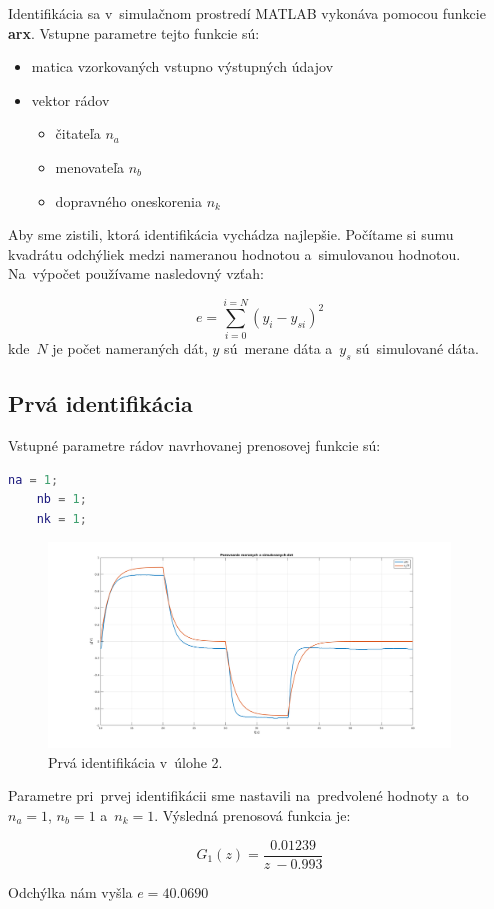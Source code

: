 \documentclass{article}
\begin{document}
Identifikácia sa v~simulačnom prostredí MATLAB vykonáva pomocou funkcie \textbf{arx}.
Vstupne parametre tejto funkcie sú: 
\begin{itemize}
	\item matica vzorkovaných vstupno výstupných údajov
	\item vektor rádov
	\begin{itemize}
		\item čitateľa $n_a$
		\item menovateľa $n_b$
		\item dopravného oneskorenia $n_k$
	\end{itemize}
\end{itemize}

Aby sme zistili, ktorá identifikácia vychádza najlepšie. Počítame si sumu kvadrátu odchýliek medzi nameranou hodnotou
a~simulovanou hodnotou. Na~výpočet používame nasledovný vzťah:

\begin{equation}
	e = \sum_{i=0}^{i=N} (y_i - y_{si})^2
	\label{eq:odchylka}
\end{equation}
kde~$N$ je počet nameraných dát, $y$ sú~merane dáta a~$y_s$ sú~simulované dáta.

\clearpage

\subsection{Prvá identifikácia}
\label{subsec:I1}

Vstupné parametre rádov navrhovanej prenosovej funkcie sú:

\begin{lstlisting}[language=Matlab]
	na = 1;
	nb = 1;
	nk = 1;
\end{lstlisting}

\begin{figure}[!htbp]
	\begin{center}
		\includegraphics[width=0.95\textwidth]{include/I1.png}
	\end{center}
	\caption{Prvá identifikácia v~úlohe 2.}
	\label{fig:I1}
\end{figure}

Parametre pri~prvej identifikácii sme nastavili na~predvolené hodnoty a~to~$n_a = 1$, $n_b = 1$ a~$n_k = 1$.
Výsledná prenosová funkcia je:

\begin{equation}
	G_1(z) = \frac{0.01239}{z~- 0.993}
	\label{eq:I1}
\end{equation}

Odchýlka nám vyšla $e = 40.0690$

\clearpage
\end{document}
